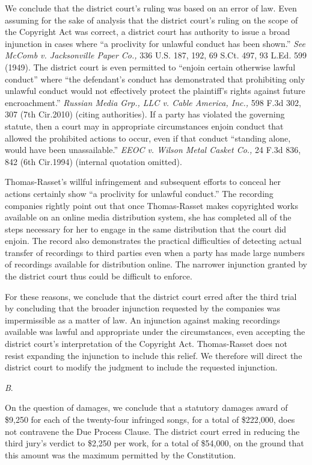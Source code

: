We conclude that the district court's ruling was based on an error of law. Even
assuming for the sake of analysis that the district court's ruling on the scope
of the Copyright Act was correct, a district court has authority to issue a
broad injunction in cases where ``a proclivity for unlawful conduct has been
shown.'' \textit{See McComb v. Jacksonville Paper Co.,} 336 U.S. 187, 192, 69
S.Ct. 497, 93 L.Ed. 599 (1949). The district court is even permitted to
``enjoin certain otherwise lawful conduct'' where ``the defendant's conduct has
demonstrated that prohibiting only unlawful conduct would not effectively
protect the plaintiff's rights against future encroachment.'' \textit{Russian
Media Grp., LLC v. Cable America, Inc.,} 598 F.3d 302, 307 (7th Cir.2010)
(citing authorities). If a party has violated the governing statute, then a
court may in appropriate circumstances enjoin conduct that allowed the
prohibited actions to occur, even if that conduct ``standing alone, would have
been unassailable.'' \textit{EEOC v. Wilson Metal Casket Co.,} 24 F.3d 836, 842
(6th Cir.1994) (internal quotation omitted).

Thomas-Rasset's willful infringement and subsequent efforts to conceal her
actions certainly show ``a proclivity for unlawful conduct.'' The recording
companies rightly point out that once Thomas-Rasset makes copyrighted works
available on an online media distribution system, she has completed all of the
steps necessary for her to engage in the same distribution that the court did
enjoin. The record also demonstrates the practical difficulties of detecting
actual transfer of recordings to third parties even when a party has made large
numbers of recordings available for distribution online. The narrower
injunction granted by the district court thus could be difficult to enforce.

For these reasons, we conclude that the district court erred after the third
trial by concluding that the broader injunction requested by the companies was
impermissible as a matter of law. An injunction against making recordings
available was lawful and appropriate under the circumstances, even accepting
the district court's interpretation of the Copyright Act. Thomas-Rasset does
not resist expanding the injunction to include this relief. We therefore will
direct the district court to modify the judgment to include the requested
injunction.

{\centering
\textit{B}.
\par}

On the question of damages, we conclude that a statutory damages award of
\$9,250 for each of the twenty-four infringed songs, for a total of \$222,000,
does not contravene the Due Process Clause. The district court erred in
reducing the third jury's verdict to \$2,250 per work, for a total of \$54,000,
on the ground that this amount was the maximum permitted by the Constitution.

